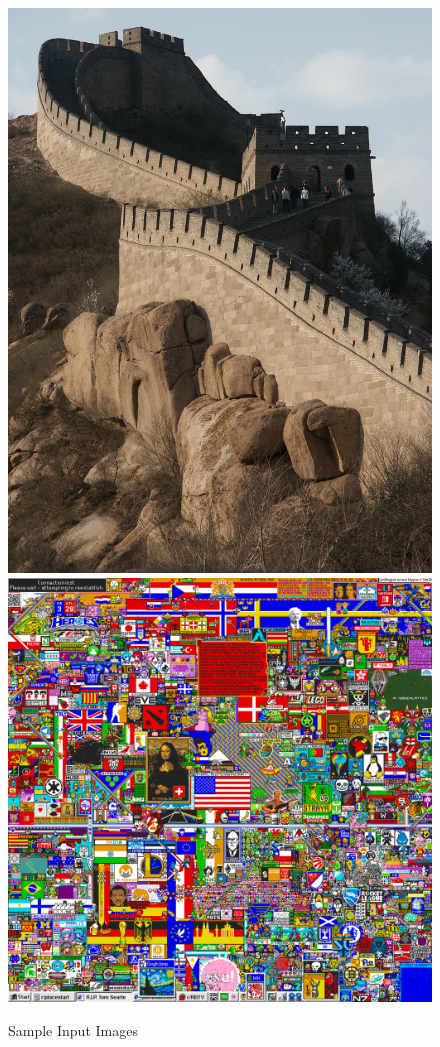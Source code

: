 \begin{figure}[!]
	\includegraphics[scale=0.04]{Figures/greatwall.jpg}
	\includegraphics[scale=0.04]{Figures/place.jpg}	
    \caption{Sample Input Images}
	\label{tss}
\end{figure}
